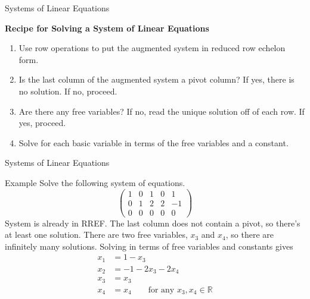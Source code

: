 \documentclass[11pt, xcolor={dvipsnames}, hyperref={colorlinks, allcolors=Blue}]{beamer}
\newcommand{\R}{\mathbb{R}}
\begin{document}
\begin{frame}{Systems of Linear Equations}
\begin{center}
\textbf{Recipe for Solving a System of Linear Equations}
\end{center}

\begin{enumerate}[1.]
\item Use row operations to put the augmented system in reduced row echelon form.
\item Is the last column of the augmented system a pivot column? If yes, there is no solution. If no, proceed.
\item Are there any free variables? If no, read the unique solution off of each row. If yes, proceed.
\item Solve for each basic variable in terms of the free variables and a constant. 
\end{enumerate}


\end{frame}

\begin{frame}{Systems of Linear Equations}
\begin{block}{Example}
Solve the following system of equations. 
\[
\left (
\begin{array}{cccc|c}
1 & 0 & 1 & 0 & 1\\
0 & 1 & 2 & 2  & -1\\
0 & 0 & 0 & 0 & 0
\end{array}
\right )
\]
\noindent
System is already in RREF. The last column does not contain a pivot, so there's at least one solution. There are two free variables, $x_3$ and $x_4$, so there are infinitely many solutions. Solving in terms of free variables and constants gives
\begin{align*}
x_1 &= 1 - x_3\\
x_2 &= -1 - 2x_3 -2x_4\\
x_3 &= x_3\\
x_4 &= x_4 \qquad \text{for any } x_3,x_4 \in \R
\end{align*}

\end{block}
\end{frame}
\end{document}
